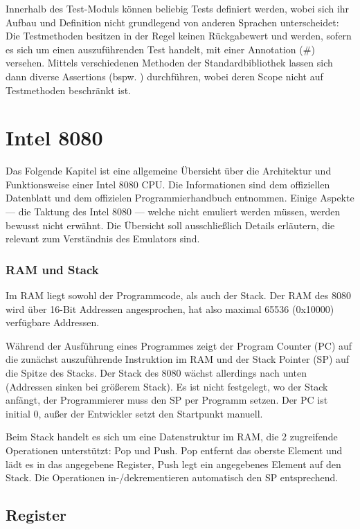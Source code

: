 Innerhalb des Test-Moduls können beliebig Tests definiert werden, wobei sich ihr Aufbau und Definition nicht grundlegend von anderen Sprachen unterscheidet: Die Testmethoden besitzen in der Regel keinen Rückgabewert und werden, sofern es sich um einen auszuführenden Test handelt, mit einer Annotation (\#\rust{[test]}) versehen. Mittels verschiedenen Methoden der Standardbibliothek lassen sich dann diverse Assertions (bspw. ) durchführen, wobei deren Scope nicht auf Testmethoden beschränkt ist.

\section{Intel 8080}

Das Folgende Kapitel ist eine allgemeine Übersicht über die Architektur und Funktionsweise einer Intel 8080 CPU. Die Informationen sind dem offiziellen Datenblatt\cite{datasheet} und dem offizielen Programmierhandbuch\cite{progManual} entnommen.
Einige Aspekte --- \zB die Taktung des Intel 8080 --- welche nicht emuliert werden müssen, werden bewusst nicht erwähnt. Die Übersicht soll ausschließlich Details erläutern, die relevant zum Verständnis des Emulators sind.

\subsubsection{RAM und Stack}

Im \ac{RAM} liegt sowohl der Programmcode, als auch der Stack.
Der \ac{RAM} des 8080 wird über 16-Bit Addressen angesprochen, hat also maximal 65536 (0x10000) verfügbare Addressen.

Während der Ausführung eines Programmes zeigt der Program Counter (PC) auf die zunächst auszuführende Instruktion im \ac{RAM} und der Stack Pointer (SP) auf die Spitze des Stacks. Der Stack des 8080 wächst allerdings nach unten (Addressen sinken bei größerem Stack).
Es ist nicht festgelegt, wo der Stack anfängt, der Programmierer muss den SP per Programm setzen. Der PC ist initial 0, außer der Entwickler setzt den Startpunkt manuell.

Beim Stack handelt es sich um eine Datenstruktur im \ac{RAM}, die 2 zugreifende Operationen unterstützt: Pop und Push. Pop entfernt das oberste Element und lädt es in das angegebene Register, Push legt ein angegebenes Element auf den Stack. Die Operationen in-/dekrementieren automatisch den SP entsprechend.

\subsection{Register}

